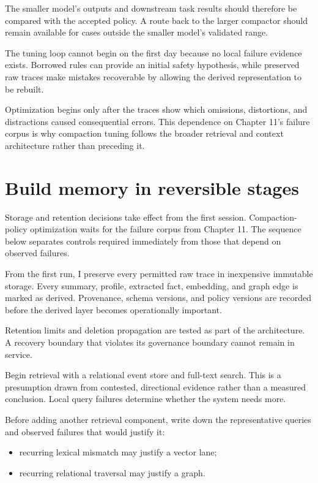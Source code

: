The smaller model's outputs and downstream task results should therefore be compared with the accepted policy. A route back to the larger compactor should remain available for cases outside the smaller model's validated range.

The tuning loop cannot begin on the first day because no local failure evidence exists. Borrowed rules can provide an initial safety hypothesis, while preserved raw traces make mistakes recoverable by allowing the derived representation to be rebuilt.

Optimization begins only after the traces show which omissions, distortions, and distractions caused consequential errors. This dependence on Chapter 11's failure corpus is why compaction tuning follows the broader retrieval and context architecture rather than preceding it.

\hypertarget{build-memory-in-reversible-stages}{%
\section{Build memory in reversible stages}\label{build-memory-in-reversible-stages}}

Storage and retention decisions take effect from the first session. Compaction-policy optimization waits for the failure corpus from Chapter 11. The sequence below separates controls required immediately from those that depend on observed failures.

From the first run, I preserve every permitted raw trace in inexpensive immutable storage. Every summary, profile, extracted fact, embedding, and graph edge is marked as derived. Provenance, schema versions, and policy versions are recorded before the derived layer becomes operationally important.

Retention limits and deletion propagation are tested as part of the architecture. A recovery boundary that violates its governance boundary cannot remain in service.

Begin retrieval with a relational event store and full-text search. This is a presumption drawn from contested, directional evidence rather than a measured conclusion. Local query failures determine whether the system needs more.


Before adding another retrieval component, write down the representative queries and observed failures that would justify it:

\begin{itemize}
\tightlist
\item
  recurring lexical mismatch may justify a vector lane;
\item
  recurring relational traversal may justify a graph.
\end{itemize}

